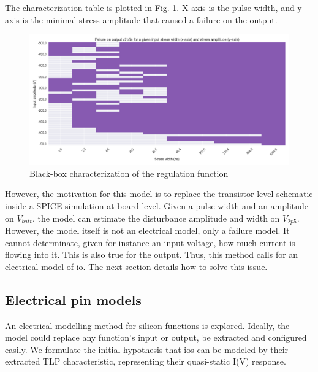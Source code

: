 
The characterization table is plotted in Fig. \ref{fig:cz-black-box}.
X-axis is the pulse width, and y-axis is the minimal stress amplitude that caused a failure on the output.

\begin{figure}[!h]
  \centering
  \includegraphics[width=\textwidth]{src/4/figures/black_box_regulator.png}
  \caption{Black-box characterization of the regulation function}
  \label{fig:cz-black-box}
\end{figure}

However, the motivation for this model is to replace the transistor-level schematic inside a SPICE simulation at board-level.
Given a pulse width and an amplitude on $V_{batt}$, the model can estimate the disturbance amplitude and width on $V_{2p5}$.
However, the model itself is not an electrical model, only a failure model.
It cannot determinate, given for instance an input voltage, how much current is flowing into it.
This is also true for the output.
Thus, this method calls for an electrical model of \gls{io}.
The next section details how to solve this issue.

\subsection{Electrical pin models}

An electrical modelling method for silicon functions is explored.
Ideally, the model could replace any function's input or output, be extracted and configured easily.
We formulate the initial hypothesis that \gls{io}s can be modeled by their extracted TLP characteristic, representing their quasi-static I(V) response.

